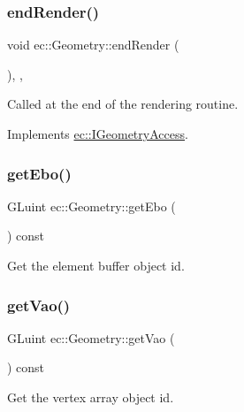 \subsubsection{\texorpdfstring{end\+Render()}{endRender()}}
{\footnotesize\ttfamily void ec\+::\+Geometry\+::end\+Render (\begin{DoxyParamCaption}{ }\end{DoxyParamCaption})\hspace{0.3cm}{\ttfamily [override]}, {\ttfamily [protected]}, {\ttfamily [virtual]}}

Called at the end of the rendering routine. 

Implements \mbox{\hyperlink{classec_1_1_i_geometry_access_a6d3b9c34a8b73aeac26663ef349ce41f}{ec\+::\+I\+Geometry\+Access}}.

\mbox{\label{classec_1_1_geometry_a5d956ff01a7b6648ede8982e0a461ae0}} 
\subsubsection{\texorpdfstring{get\+Ebo()}{getEbo()}}
{\footnotesize\ttfamily G\+Luint ec\+::\+Geometry\+::get\+Ebo (\begin{DoxyParamCaption}{ }\end{DoxyParamCaption}) const}

Get the element buffer object id. \mbox{\label{classec_1_1_geometry_a91a89baad39d4f2b2c4e9774d952dce9}} 
\subsubsection{\texorpdfstring{get\+Vao()}{getVao()}}
{\footnotesize\ttfamily G\+Luint ec\+::\+Geometry\+::get\+Vao (\begin{DoxyParamCaption}{ }\end{DoxyParamCaption}) const}

Get the vertex array object id. \mbox{\label{classec_1_1_geometry_abad5d4311d16462099b8f9d084d99dd4}} 
